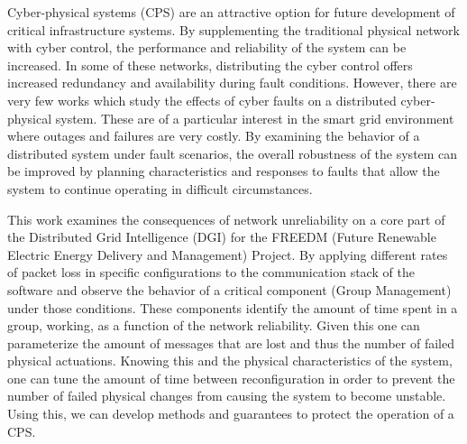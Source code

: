 Cyber-physical systems (CPS) are an attractive option for future development of
critical infrastructure systems. By supplementing the traditional physical
network with cyber control, the performance and reliability of the system
can be increased. In some of these networks, distributing the cyber control
offers increased redundancy and availability during fault conditions. However,
there are very few works which study the effects of cyber faults on a 
distributed cyber-physical system. These are of a particular interest in the smart grid
environment where outages and failures are very costly. By examining the
behavior of a distributed system under fault scenarios, the overall robustness
of the system can be improved by planning characteristics and responses to
faults that allow the system to continue operating in difficult circumstances.

This work examines the consequences of network unreliability on a core part of the
 Distributed Grid Intelligence (DGI) for the FREEDM (Future Renewable Electric 
Energy Delivery and Management) Project. By applying different rates of packet
loss in specific configurations to the communication stack of the software and
observe the behavior of a critical component (Group Management) under those
conditions. These components identify the amount of time spent in a group,
working, as a function of the network reliability. Given this one can parameterize
the amount of messages that are lost and thus the number of failed physical actuations.
Knowing this and the physical characteristics of the system, one can tune the amount
of time between reconfiguration in order to prevent the number of failed physical
changes from causing the system to become unstable. Using this, we can develop
methods and guarantees to protect the operation of a CPS.
